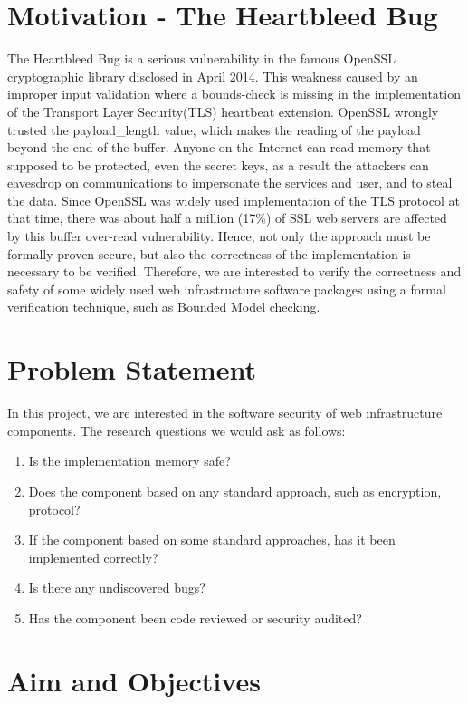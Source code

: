 \section{Motivation - The Heartbleed Bug} \label{sec:heartbleed bug}
The Heartbleed Bug is a serious vulnerability in the famous OpenSSL cryptographic library disclosed in April 2014. This weakness caused by an improper input validation where a bounds-check is missing in the implementation of the Transport Layer Security(TLS) heartbeat extension. OpenSSL wrongly trusted the payload\string_length value, which makes the reading of the payload beyond the end of the buffer. Anyone on the Internet can read memory that supposed to be protected, even the secret keys, as a result the attackers can eavesdrop on communications to impersonate the services and user, and to steal the data. Since OpenSSL was widely used implementation of the TLS protocol at that time, there was about half a million (17\%) of SSL web servers are affected \cite{9_heartbleed} by this buffer over-read vulnerability. Hence, not only the approach must be formally proven secure, but also the correctness of the implementation is necessary to be verified. Therefore, we are interested to verify the correctness and safety of some widely used web infrastructure software packages using a formal verification technique, such as Bounded Model checking.

\section{Problem Statement}
In this project, we are interested in the software security of web infrastructure components. The research questions we would ask as follows:

\begin{enumerate}
    \item Is the implementation memory safe?
    \item Does the component based on any standard approach, such as encryption, protocol?
    \item If the component based on some standard approaches, has it been implemented correctly?
    \item Is there any undiscovered bugs?
    \item Has the component been code reviewed or security audited?
\end{enumerate}

\section{Aim and Objectives}
